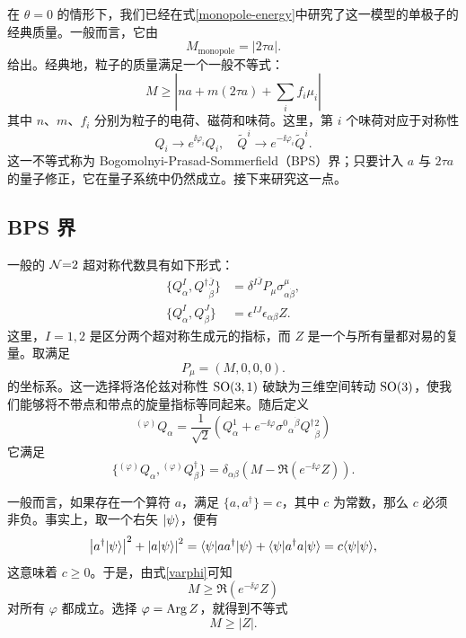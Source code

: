 在 $\theta=0$ 的情形下，我们已经在式\eqref{monopole-energy}中研究了这一模型的单极子的经典质量。一般而言，它由
\begin{equation}
M_\text{monopole}=|2\tau a|.
\end{equation}
给出。经典地，粒子的质量满足一个一般不等式：
\begin{equation}
M \geq |na+m(2\tau a) + \sum_i f_i \mu_i| \label{classicalBPS}
\end{equation}
其中 $n$、$m$、$f_i$ 分别为粒子的电荷、磁荷和味荷。这里，第 $i$ 个味荷对应于对称性
\begin{equation}
Q_i \to e^{\ii\varphi_i} Q_i,\quad
\tilde Q^i \to e^{-\ii\varphi_i} \tilde Q^i.
\end{equation}
这一不等式称为 Bogomolnyi-Prasad-Sommerfield（BPS）界；只要计入 $a$ 与 $2\tau a$ 的量子修正，它在量子系统中仍然成立。接下来研究这一点。

\subsection{BPS 界}
一般的 $\mathcal{N}{=}2$ 超对称代数具有如下形式：
\begin{align}
\{Q^I_\alpha,Q^\dagger{}^{\bar J}_{\dot \beta}\} &= \delta^{I\bar J} P_{\mu} \sigma^\mu_{\alpha\dot\beta},\\
\{Q^I_\alpha , Q^J_\beta\}&= \epsilon^{IJ} \epsilon_{\alpha\beta}Z.\label{Zcomm}
\end{align}
这里，$I=1,2$ 是区分两个超对称生成元的指标，而 $Z$ 是一个与所有量都对易的复量。取满足
\begin{equation}
P_\mu = (M,0,0,0).
\end{equation}
的坐标系。这一选择将洛伦兹对称性 $\mathop{\mathrm{SO}}(3,1)$ 破缺为三维空间转动 $\mathop{\mathrm{SO}}(3)$，使我们能够将不带点和带点的旋量指标等同起来。随后定义
\begin{equation}
{}^{(\varphi)}Q_\alpha=\frac{1}{\sqrt2}(Q^1_\alpha + e^{-\ii\varphi} \sigma^0{}_{\alpha}{}^{\dot\beta} Q^\dagger{}^2_{\dot\beta})
\end{equation}
它满足
\begin{equation}
\{
{}^{(\varphi)}Q_\alpha,
{}^{(\varphi)}Q^\dagger_\beta
\}=\delta_{\alpha\beta} (M-\Re (e^{-\ii\varphi} Z)).\label{varphi}
\end{equation}

一般而言，如果存在一个算符 $a$，满足 $\{a,a^\dagger\}=c$，其中 $c$ 为常数，那么 $c$ 必须非负。事实上，取一个右矢 $|\psi\rangle$，便有
\begin{equation}
\left|a^\dagger |\psi\rangle\right|^2
+\left|a |\psi\rangle\right|^2
=\langle\psi|a a^\dagger|\psi\rangle+\langle\psi|a^\dagger a|\psi\rangle = c\langle\psi|\psi\rangle,\label{tmp}
\end{equation}
这意味着 $c\ge0$。于是，由式\eqref{varphi}可知
\begin{equation}
M\ge \Re (e^{-\ii\varphi} Z)
\end{equation}
对所有 $\varphi$ 都成立。选择 $\varphi=\mathop{\mathrm{Arg}}\nolimits Z$，就得到不等式
\begin{equation}
M\geq |Z|. \label{BPS}
\end{equation}

